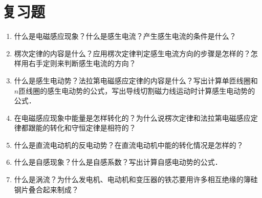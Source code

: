 \section*{复习题}
\begin{enumerate}
    \item 什么是电磁感应现象？什么是感生电流？产生感生电流的条件是什么？
    \item 楞次定律的内容是什么？应用楞次定律判定感生电流方向的步骤是怎样的？怎样用右手定则来判断感生电流的方向？
    \item 什么是感生电动势？法拉第电磁感应定律的内容是什么？写出计算单匝线圈和$n$匝线圈的感生电动势的公式，写出导线切割磁力线运动时计算感生电动势的公式．
    \item 在电磁感应现象中能量是怎样转化的？为什么说楞次定律和法拉第电磁感应定律都跟能的转化和守恒定律是相符的？
    \item 什么是直流电动机的反电动势？在直流电动机中能的转化情况是怎样的？
    \item 什么是自感现象？什么是自感系数？写出计算自感电动势的公式．
    \item 什么是涡流？为什么发电机、电动机和变压器的铁芯要用许多相互绝缘的簿硅钢片叠合起来制成？
\end{enumerate}

